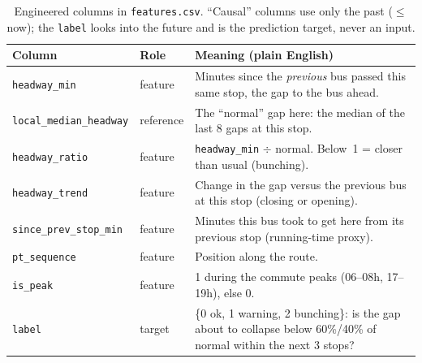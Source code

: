 \documentclass[final,5p,times,twocolumn,authoryear]{elsarticle}
\begin{document}
\begin{table}[t]
\centering
\small
\caption{Engineered columns in \texttt{features.csv}. ``Causal'' columns use only the past
($\le$ now); the \texttt{label} looks into the future and is the prediction target, never an input.}
\label{tab:feat}
\begin{tabular}{P{3.2cm}P{1.5cm}P{8.2cm}}
\toprule
Column & Role & Meaning (plain English) \\
\midrule
\texttt{headway\_min}          & feature & Minutes since the \emph{previous} bus passed this same stop, the gap to the bus ahead. \\
\texttt{local\_median\_headway}& reference & The ``normal'' gap here: the median of the last 8 gaps at this stop. \\
\texttt{headway\_ratio}        & feature & \texttt{headway\_min} $\div$ normal. Below~1 = closer than usual (bunching). \\
\texttt{headway\_trend}        & feature & Change in the gap versus the previous bus at this stop (closing or opening). \\
\texttt{since\_prev\_stop\_min}& feature & Minutes this bus took to get here from its previous stop (running-time proxy). \\
\texttt{pt\_sequence}          & feature & Position along the route. \\
\texttt{is\_peak}              & feature & 1 during the commute peaks (06--08h, 17--19h), else 0. \\
\texttt{label}                 & target  & \{0 ok, 1 warning, 2 bunching\}: is the gap about to collapse below 60\%/40\% of normal within the next 3 stops? \\
\bottomrule
\end{tabular}
\end{table}
\end{document}
